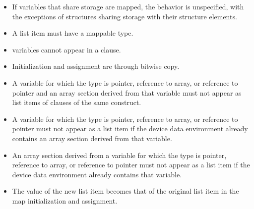 \begin{itemize}

\item If variables that share storage are mapped, the behavior is unspecified, with the exceptions of structures sharing storage with their structure elements.

\item A list item must have a mappable type.

\item {} variables cannot appear in a  clause.
\end{itemize}

\ccppspecificstart
\begin{itemize}
\item Initialization and assignment are through bitwise copy.

\item A variable for which the type is pointer, reference to array, or reference to pointer and 
an array section derived from that variable must not appear as list items of 
clauses of the same construct. 

\item A variable for which the type is pointer, reference to array, or reference to pointer must not appear as a list item if the device data environment already contains an array section derived from that variable.

\item An array section derived from a variable for which the type is pointer, reference to array, or reference to pointer must not appear as a list item if the device data environment already contains that variable. 
\end{itemize}
\ccppspecificend

\begin{samepage}
\fortranspecificstart
\begin{itemize}
\item The value of the new list item becomes that of the original list item in the map 
initialization and assignment.
\fortranspecificend
\end{itemize}
\end{samepage}





